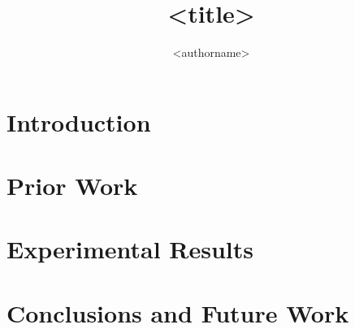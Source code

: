 \documentclass[times,10pt,twocolumn]{article}
\begin{document}
\title{<title>}
\author[]{<authorname>} 
\maketitle
\newtheorem{defn}{Definition}
\newtheorem{thm}{Theorem}
\thispagestyle{empty}
\begin{abstract}

\end{abstract}

\section{Introduction}
\label{sec:Introduction}

\section{Prior Work}
\label{sec:prior}

\section{Experimental Results}
\label{sec:experiment}

\section{Conclusions and Future Work}
\label{sec:conclusions}

\label{sec:references}
\small



\end{document}

